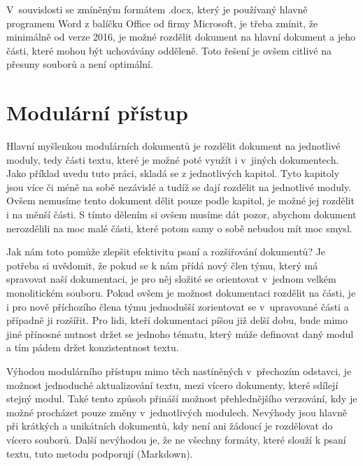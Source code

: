 V~souvislosti se zmíněným formátem .docx, který je používaný hlavně programem Word z balíčku Office od firmy Microsoft, je třeba zmínit, že minimálně od verze 2016, je
možné rozdělit dokument na hlavní dokument a jeho části, které mohou být uchovávány odděleně. \cite{msWord} Toto řešení je ovšem citlivé na přesuny souborů
a není optimální.

\section{Modulární přístup}

Hlavní myšlenkou modulárních dokumentů je rozdělit dokument na jednotlivé moduly, tedy části textu, které je možné poté využít i v~jiných dokumentech. Jako příklad uvedu
tuto práci, skladá se z jednotlivých kapitol. Tyto kapitoly jsou více či méně na sobě nezávislé a tudíž se dají rozdělit na jednotlivé moduly. Ovšem nemusíme tento
dokument dělit pouze podle kapitol, je možné jej rozdělit i na měnší části. S tímto dělením si ovšem musíme dát pozor, abychom dokument nerozdělili na moc malé části,
které potom samy o sobě nebudou mít moc smysl.

Jak nám toto pomůže zlepšit efektivitu psaní a rozšiřování dokumentů? Je potřeba si uvědomit, že pokud se k nám přídá nový člen týmu, který má spravovat naší
dokumentaci, je pro něj složité se orientovat v~jednom velkém monolitickém souboru. Pokud ovšem je možnost dokumentaci rozdělit
na části, je i pro nově příchozího člena týmu jednodušší zorientovat se v~upravované části a případně ji rozšířit. Pro lidi, kteří dokumentaci píšou již delší dobu, bude mimo jiné přínosné
nutnost držet se jednoho tématu, který může definovat daný modul a tím pádem držet konzistentnost textu. \cite{modularDocuments}

Výhodou modulárního přístupu mimo těch nastíněných v~přechozím odstavci, je možnost jednoduché aktualizování textu, mezi vícero dokumenty, které sdílejí stejný modul. Také
tento způsob přináší možnost přehlednějšího verzování, kdy je možné procházet pouze změny v~jednotlivých modulech. Nevýhody jsou hlavně při krátkých a unikátních dokumentů,
kdy není ani žádoucí je rozdělovat do vícero souborů. Další nevýhodou je, že ne všechny formáty, které slouží k psaní textu, tuto metodu podporují (Markdown).
